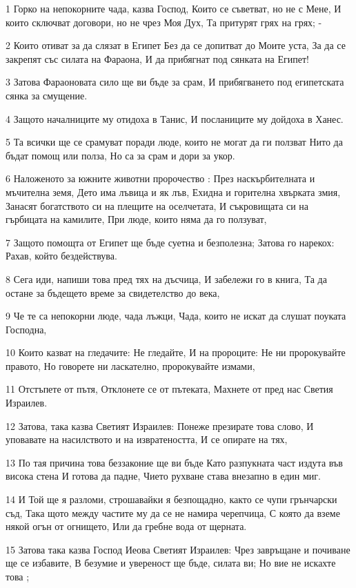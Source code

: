 \par 1 Горко на непокорните чада, казва Господ, Които се съветват, но не с Мене, И които сключват договори, но не чрез Моя Дух, Та притурят грях на грях; -
\par 2 Които отиват за да слязат в Египет Без да се допитват до Моите уста, За да се закрепят със силата на Фараона, И да прибягнат под сянката на Египет!
\par 3 Затова Фараоновата сило ще ви бъде за срам, И прибягването под египетската сянка за смущение.
\par 4 Защото началниците му отидоха в Танис, И посланиците му дойдоха в Ханес.
\par 5 Та всички ще се срамуват поради люде, които не могат да ги ползват Нито да бъдат помощ или полза, Но са за срам и дори за укор.
\par 6 Наложеното за южните животни пророчество : През наскърбителната и мъчителна земя, Дето има лъвица и як лъв, Ехидна и горителна хвърката змия, Занасят богатството си на плещите на оселчетата, И съкровищата си на гърбицата на камилите, При люде, които няма да го ползуват,
\par 7 Защото помощта от Египет ще бъде суетна и безполезна; Затова го нарекох: Рахав, който бездействува.
\par 8 Сега иди, напиши това пред тях на дъсчица, И забележи го в книга, Та да остане за бъдещето време за свидетелство до века,
\par 9 Че те са непокорни люде, чада лъжци, Чада, които не искат да слушат поуката Господна,
\par 10 Които казват на гледачите: Не гледайте, И на пророците: Не ни пророкувайте правото, Но говорете ни ласкателно, пророкувайте измами,
\par 11 Отстъпете от пътя, Отклонете се от пътеката, Махнете от пред нас Светия Израилев.
\par 12 Затова, така казва Светият Израилев: Понеже презирате това слово, И уповавате на насилството и на извратеността, И се опирате на тях,
\par 13 По тая причина това беззаконие ще ви бъде Като разпукната част издута във висока стена И готова да падне, Чието рухване става внезапно в един миг.
\par 14 И Той ще я разломи, строшавайки я безпощадно, както се чупи грънчарски съд, Така щото между частите му да се не намира черепчица, С която да вземе някой огън от огнището, Или да гребне вода от щерната.
\par 15 Затова така казва Господ Иеова Светият Израилев: Чрез завръщане и почиване ще се избавите, В безумие и увереност ще бъде, силата ви; Но вие не искахте това ;

